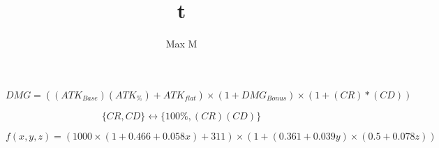 \documentclass[a4paper]{article}
\title{t}
\author{Max M}
\begin{document}
\begin{equation}
	DMG = \left((ATK_{Base})(ATK_{\%}) + ATK_{flat}\right)\times (1 + DMG_{Bonus}) \times (1 + (CR)*(CD)) 
\end{equation}

\begin{equation}
	\{CR, CD\} \longleftrightarrow \{100\%, (CR)(CD)\}
\end{equation}


\begin{equation}
	f(x,y,z) = (1000\times(1 + 0.466 + 0.058x) + 311)\times(1 + (0.361 + 0.039y)\times(0.5 + 0.078z))
\end{equation}
\end{document}
